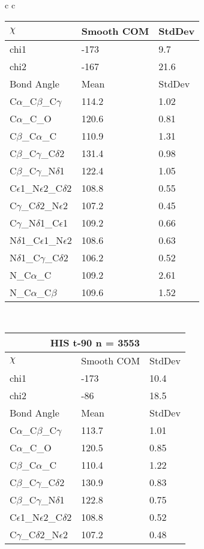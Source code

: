 \begin{longtable}{ c c }
\begin{tabular}{ l l l }
  $\chi$       & Smooth COM & StdDev \\ \midrule
  chi1 & -173 & 9.7 \\ 
  chi2 & -167 & 21.6 \\ \midrule
  Bond Angle   & Mean     & StdDev \\ \midrule
  C$\alpha$\_C$\beta$\_C$\gamma$ & 114.2 & 1.02\\
  C$\alpha$\_C\_O & 120.6 & 0.81\\
  C$\beta$\_C$\alpha$\_C & 110.9 & 1.31\\
  C$\beta$\_C$\gamma$\_C$\delta$2 & 131.4 & 0.98\\
  C$\beta$\_C$\gamma$\_N$\delta$1 & 122.4 & 1.05\\
  C$\epsilon$1\_N$\epsilon$2\_C$\delta$2 & 108.8 & 0.55\\
  C$\gamma$\_C$\delta$2\_N$\epsilon$2 & 107.2 & 0.45\\
  C$\gamma$\_N$\delta$1\_C$\epsilon$1 & 109.2 & 0.66\\
  N$\delta$1\_C$\epsilon$1\_N$\epsilon$2 & 108.6 & 0.63\\
  N$\delta$1\_C$\gamma$\_C$\delta$2 & 106.2 & 0.52\\
  N\_C$\alpha$\_C & 109.2 & 2.61\\
  N\_C$\alpha$\_C$\beta$ & 109.6 & 1.52\\
  \bottomrule
  \end{tabular}
  \\
  \begin{tabular}{ l l l }
  \toprule
  \multicolumn{3}{c}{HIS \textbf{t-90} n = 3553} \\ \toprule
  $\chi$       & Smooth COM & StdDev \\ \midrule
  chi1 & -173 & 10.4 \\ 
  chi2 & -86 & 18.5 \\ \midrule
  Bond Angle   & Mean     & StdDev \\ \midrule
  C$\alpha$\_C$\beta$\_C$\gamma$ & 113.7 & 1.01\\
  C$\alpha$\_C\_O & 120.5 & 0.85\\
  C$\beta$\_C$\alpha$\_C & 110.4 & 1.22\\
  C$\beta$\_C$\gamma$\_C$\delta$2 & 130.9 & 0.83\\
  C$\beta$\_C$\gamma$\_N$\delta$1 & 122.8 & 0.75\\
  C$\epsilon$1\_N$\epsilon$2\_C$\delta$2 & 108.8 & 0.52\\
  C$\gamma$\_C$\delta$2\_N$\epsilon$2 & 107.2 & 0.48\\

\end{tabular}
\end{longtable}
